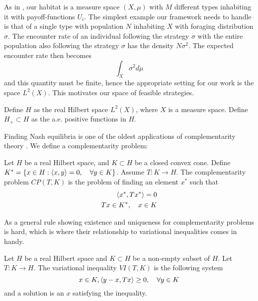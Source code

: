 As in , our habitat is a measure space $(X,\mu)$ with $M$ different types inhabiting it with payoff-functions $U_i$. The simplest example our framework needs to handle is that of a single type with population $N$ inhabiting $X$ with foraging distribution $\sigma$. The encounter rate of an individual following the strategy $\sigma$ with the entire population also following the strategy $\sigma$ has the density $N\sigma^2$. The expected encounter rate then becomes
\begin{equation}
  \int_X \sigma^2 d\mu
\end{equation}
and this quantity must be finite, hence the appropriate setting for our work is the space $L^2(X)$. This motivates our space of feasible strategies.
\begin{definition}
  Define $H$ as the real Hilbert space $L^2(X)$, where $X$ is a measure space. Define $H_+ \subset H$ as the a.e. positive functions in $H$.
\end{definition}
Finding Nash equilibria is one of the oldest applications of complementarity theory \citep{karamardian1969nonlinear}. We define a complementarity problem:
\begin{definition}
  Let $H$ be a real Hilbert space, and $K \subset H$ be a closed convex cone. Define $K^* = \{ x \in H : \left \langle x,y \right \rangle = 0, \quad \forall y\in K\} $. Assume $T:K \to H$. The complementarity problem $CP(T,K)$ is the problem of finding an element $x^*$ such that
  \begin{equation}
    \begin{split}
    \left \langle x^*,Tx^* \right \rangle = 0 \\
    Tx \in K^*, \quad  x\in K
  \end{split}
  \end{equation}
\end{definition}
As a general rule showing existence and uniqueness for complementarity problems is hard, which is where their relationship to variational inequalities comes in handy.
\begin{definition}
  Let $H$ be a real Hilbert space and $K\subset H$ be a non-empty subset of $H$. Let $T: K \to H$. The variational inequality $VI(T,K)$ is the following system
  \begin{equation}
    x \in K, \left \langle y-x,Tx \right \rangle \geq 0, \quad \forall y \in K
  \end{equation}
  and a solution is an $x$ satisfying the inequality.
\end{definition}


